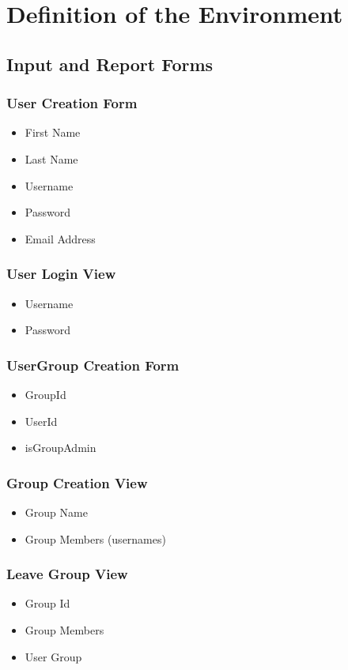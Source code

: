 \documentclass[11pt, a4paper]{report}
\begin{document}
\chapter{Definition of the Environment}
\section{Input and Report Forms}

\subsection*{User Creation Form}
\begin{itemize}
\item First Name
\item Last Name
\item Username
\item Password
\item Email Address
\end{itemize}

\subsection*{User Login View}
\begin{itemize}
\item Username
\item Password
\end{itemize}

\subsection*{UserGroup Creation Form}
\begin{itemize}
\item GroupId
\item UserId
\item isGroupAdmin
\end{itemize}

\subsection*{Group Creation View}
\begin{itemize}
\item Group Name
\item Group Members (usernames)
\end{itemize}

\subsection*{Leave Group View}
\begin{itemize}
\item Group Id
\item Group Members
\item User Group
\end{itemize}
\end{document}
